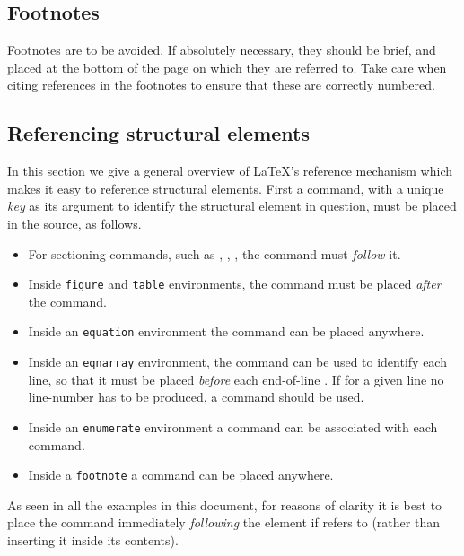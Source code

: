 \documentclass{cernrep}
\begin{document}
\subsection{Footnotes}

Footnotes are to be avoided. If absolutely necessary, they should be
brief, and placed at the bottom of the page on which they are referred
to. Take care when citing references in the footnotes to ensure that
these are correctly numbered.

\subsection{Referencing structural elements}
\label{sec:crossref}

In this section we give a general overview of \LaTeX's reference
mechanism which makes it easy to reference structural elements. First
a  command, with a unique \emph{key} as its argument to
identify the structural element in question, must be placed in the
source, as follows.

\begin{itemize}
\item For sectioning commands, such as ,
      , , the  command
      must \emph{follow} it.
\item Inside \texttt{figure} and \texttt{table} environments, the 
       command must be placed \emph{after} the 
      command.
\item Inside an \texttt{equation} environment the  command
      can be placed anywhere.
\item Inside an \texttt{eqnarray} environment, the  command
      can be used to identify each line, so that it must be placed
      \emph{before} each end-of-line \Lcs{\bs}. If for a given line no
      line-number has to be produced, a  command should
      be used.
\item Inside an \texttt{enumerate} environment a  command
      can be associated with each  command.
\item Inside a \texttt{footnote} a  command can be placed
      anywhere.
\end{itemize}
As seen in all the examples in this document, for reasons of clarity
it is best to place the  command immediately
\emph{following} the element if refers to (rather than inserting it
inside its contents).
\end{document}
